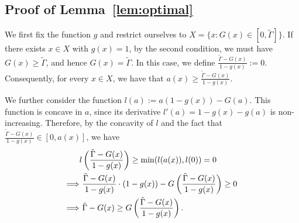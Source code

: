\documentclass[11pt,letterpaper]{article}
\begin{document}
\subsection{Proof of Lemma~\ref{lem:optimal}}
We first fix the function $g$ and restrict ourselves to $X=\{x: G(x) \in [0, \tilde{\Gamma}]\}$. If there exists $x\in X$ with $g(x)=1$, by the second condition, we must have $G(x) \ge \tilde\Gamma$, and hence $G(x)=\tilde\Gamma$. In this case, we define $\frac{\tilde\Gamma-G(x)}{1-g(x)} := 0$.
Consequently, for every $x \in X$, we have that $a(x) \ge \frac{\tilde\Gamma-G(x)}{1-g(x)}$.

We further consider the function $l(a):=a(1-g(x))-G(a)$. This function is concave in $a$, since its derivative $l'(a)=1-g(x)-g(a)$ is non-increasing. 
Therefore, by the concavity of $l$ and the fact that $\frac{\tilde\Gamma-G(x)}{1-g(x)} \in [0,a(x)]$, we have
\begin{align}
\label{eqn:condition}
& l\left(\frac{\tilde\Gamma-G(x)}{1-g(x)}\right) \ge \min (l(a(x)), l(0)) =0 \notag \\
\Longrightarrow & \ \frac{\tilde\Gamma-G(x)}{1-g(x)} \cdot (1-g(x)) - G\left(\frac{\tilde\Gamma-G(x)}{1-g(x)}\right) \ge 0 \notag \\
\Longrightarrow & \ \tilde\Gamma -G(x) \ge G\left( \frac{\tilde\Gamma-G(x)}{1-g(x)} \right).
\end{align}
\end{document}
